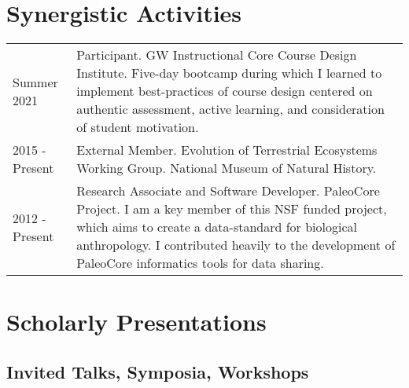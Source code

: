 \documentclass{article}
\begin{document}
\section*{Synergistic Activities}
\begin{tabular}{p{}p{}}

Summer 2021 & Participant. GW Instructional Core Course Design Institute. Five-day bootcamp during which I learned to implement best-practices of course design centered on authentic assessment, active learning, and consideration of student motivation.\\[4pt]

2015 - Present & External Member. Evolution of Terrestrial Ecosystems Working Group. National Museum of Natural History.\\[4pt]

2012 - Present & Research Associate and Software Developer. PaleoCore Project. I am a key member of this NSF funded project, which aims to create a data-standard for biological anthropology. I contributed heavily to the development of PaleoCore informatics tools for data sharing.\\
\end{tabular}

\section*{Scholarly Presentations}
\subsection*{Invited Talks, Symposia, Workshops}
\end{document}
